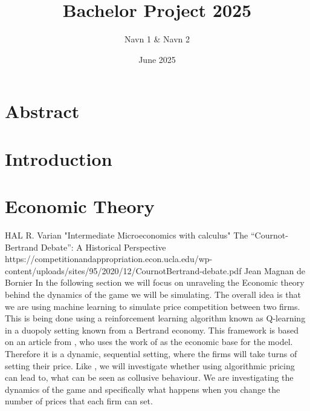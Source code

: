 \documentclass{article}
\title{Bachelor Project 2025}
\author{Navn 1 & Navn 2}
\date{June 2025}
\begin{document}
\maketitle
{}
\setcounter{page}{1} 

\newpage
\section*{Abstract}



\newpage
\tableofcontents
\newpage

\setcounter{page}{1} 

\section{Introduction}

\section{Economic Theory}
HAL R. Varian "Intermediate Microeconomics with calculus"
\newline 
The “Cournot-Bertrand Debate”:
A Historical Perspective 
https://competitionandappropriation.econ.ucla.edu/wp-content/uploads/sites/95/2020/12/CournotBertrand-debate.pdf
Jean Magnan de Bornier 
\newline
In the following section we will focus on unraveling the Economic theory behind the dynamics of the game we will be simulating. 
The overall idea is that we are using machine learning to simulate price competition between two firms. This is being done using a reinforcement learning algorithm known as Q-learning in a duopoly setting known from a Bertrand economy. This framework is based on an article from \cite{Klein2021}, who uses the work of \cite{MaskinTirole} as the economic base for the model. Therefore it is a dynamic, sequential setting, where the firms will take turns of setting their price.
Like \cite{Klein2021}, we will investigate whether using algorithmic pricing can lead to, what can be seen as collusive behaviour.
\newline
We are investigating the dynamics of the game and specifically what happens when you change the number of prices that each firm can set.
\newline
\end{document}
